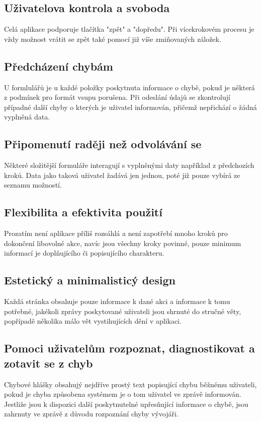 \documentclass[thesis=B,czech]{FITthesis}[2012/06/26]
\begin{document}
		\subsection{Uživatelova kontrola a svoboda}
			Celá aplikace podporuje tlačítka "zpět" a "dopředu". Při vícekrokovém procesu je vždy možnost vrátit se zpět také pomocí již víše zmiňovaných záložek.

		\subsection{Předcházení chybám}
			U formlulářů je u každé položky poskytnuta informace o chybě, pokud je některá z podmínek pro formát vsupu porušena. Při odeslání údajů se zkontrolují případné další chyby o kterých je uživatel informován, přičemž nepřichází o žádná vyplněná data.

		\subsection{Připomenutí raději než odvolávání se}
			Některé složitější formuláře interagují s vyplněnými daty například z předchozích kroků. Data jako taková uživatel žadává jen jednou, poté již pouze vybírá ze seznamu možností.

		\subsection{Flexibilita a efektivita použití}
			Prozatím není aplikace příliš rozsáhlá a není zapotřebí mnoho kroků pro dokončení libovolné akce, navíc jsou všechny kroky povinné, pouze minimum informací je doplňujícího či popisujícího charakteru.

		\subsection{Estetický a minimalisticý design}
			Každá stránka obsahuje pouze informace k dané akci a informace k tomu potřebné, jakékoli zprávy poskytované uživateli jsou shrnuté do stručné věty, popřípadě několika málo vět vystihujících dění v aplikaci.

		\subsection{Pomoci uživatelům rozpoznat, diagnostikovat a zotavit se z chyb}
			Chybové hlášky obsahujý nejdříve prostý text popisující chybu běžnému uživateli, pokud je chyba způsobena systémem je o tom uživatel ve zprávě informován. Jestliže jsou k dispozici další poskytnutelné upřesňující informace o chybě, jsou zahrnuty ve zprávě z důvodu rozpoznání chyby vývojáři.
\end{document}
